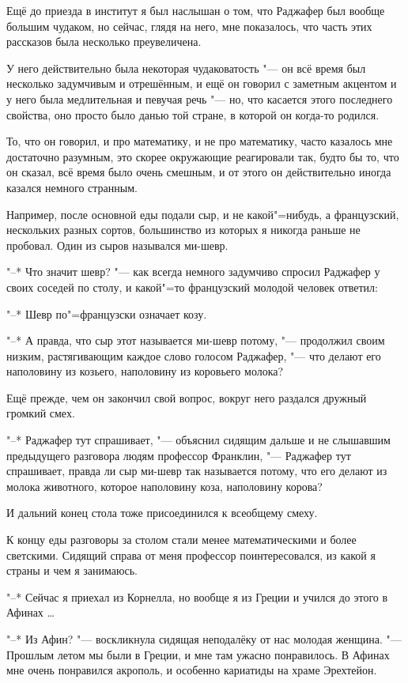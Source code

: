 Ещё до приезда в институт я был наслышан о том, что Раджафер был вообще большим
чудаком, но сейчас, глядя на него, мне показалось, что часть этих рассказов была
несколько преувеличена.

У него действительно была некоторая чудаковатость "--- он всё время был
несколько задумчивым и отрешённым, и ещё он говорил с заметным акцентом и у него
была медлительная и певучая речь "--- но, что касается этого последнего
свойства, оно просто было данью той стране, в которой он когда-то родился.

То, что он говорил, и про математику, и не про математику, часто казалось мне
достаточно разумным, это скорее окружающие реагировали так, будто бы то, что он
сказал, всё время было очень смешным, и от этого он действительно иногда казался
немного странным.

Например, после основной еды подали сыр, и не какой"=нибудь, а французский,
нескольких разных сортов, большинство из которых я никогда раньше не пробовал.
Один из сыров назывался ми-шевр.

"--* Что значит шевр? "--- как всегда немного задумчиво спросил Раджафер у своих
соседей по столу, и какой"=то французский молодой человек ответил:

"--* Шевр по"=французски означает козу.

"--* А правда, что сыр этот называется ми-шевр потому, "--- продолжил своим
низким, растягивающим каждое слово голосом Раджафер, "--- что делают его
наполовину из козьего, наполовину из коровьего молока?

Ещё прежде, чем он закончил свой вопрос, вокруг него раздался дружный громкий
смех.

"--* Раджафер тут спрашивает, "--- объяснил сидящим дальше и не слышавшим
предыдущего разговора людям профессор Франклин, "--- Раджафер тут спрашивает,
правда ли сыр ми-шевр так называется потому, что его делают из молока животного,
которое наполовину коза, наполовину корова?

И дальний конец стола тоже присоединился к всеобщему смеху.

К концу еды разговоры за столом стали менее математическими и более светскими.
Сидящий справа от меня профессор поинтересовался, из какой я страны и чем я
занимаюсь.

"--* Сейчас я приехал из Корнелла, но вообще я из Греции и учился до этого в
Афинах \ldots

"--* Из Афин? "--- воскликнула сидящая неподалёку от нас молодая женщина.
"--- Прошлым летом мы были в Греции, и мне там ужасно понравилось.
В Афинах мне очень понравился акрополь, и особенно кариатиды на храме Эрехтейон.

